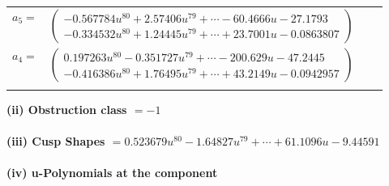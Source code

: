 \documentclass[1p]{elsarticle_modified}
\theoremstyle{definition}
\begin{document}
\begin{tabular}{m{7pt} m{180pt} m{7pt} m{180pt} }
\flushright $a_{5}=$&$\begin{pmatrix}-0.567784 u^{80}+2.57406 u^{79}+\cdots-60.4666 u-27.1793\\-0.334532 u^{80}+1.24445 u^{79}+\cdots+23.7001 u-0.0863807\end{pmatrix}$ \\
\flushright $a_{4}=$&$\begin{pmatrix}0.197263 u^{80}-0.351727 u^{79}+\cdots-200.629 u-47.2445\\-0.416386 u^{80}+1.76495 u^{79}+\cdots+43.2149 u-0.0942957\end{pmatrix}$\\&\end{tabular}
\flushleft \textbf{(ii) Obstruction class $= -1$}\\~\\
\flushleft \textbf{(iii) Cusp Shapes $= 0.523679 u^{80}-1.64827 u^{79}+\cdots+61.1096 u-9.44591$}\\~\\
\newpage\renewcommand{\arraystretch}{1}
\flushleft \textbf{(iv) u-Polynomials at the component}\newline \\
\end{document}
